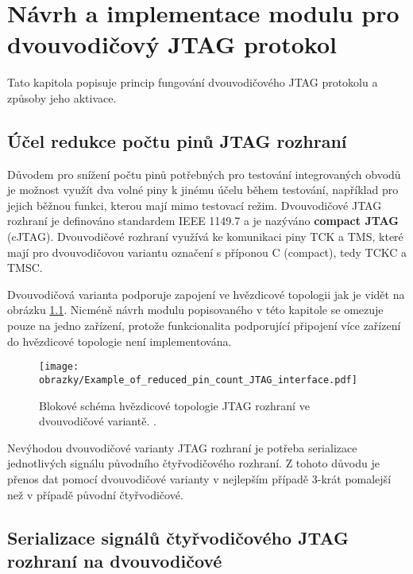 
\chapter{Návrh a implementace modulu pro dvouvodičový JTAG protokol}
Tato kapitola popisuje princip fungování dvouvodičového \acs{JTAG} protokolu a způsoby jeho aktivace.

\section{Účel redukce počtu pinů \acs{JTAG} rozhraní}	\label{sec:2w_interface}
Důvodem pro snížení počtu pinů potřebných pro testování integrovaných obvodů je možnost využít dva volné piny k jinému účelu během testování, například pro jejich běžnou funkci, kterou mají mimo testovací režim. Dvouvodičové \acs{JTAG} rozhraní je definováno standardem IEEE 1149.7 a je nazýváno \textbf{compact \acs{JTAG}} (c\acs{JTAG}). Dvouvodičové rozhraní využívá ke komunikaci piny \acs{TCK} a \acs{TMS}, které mají pro dvouvodičovou variantu označení s příponou C (compact), tedy TCKC a TMSC. \cite{IEEE_1149-7} \cite{JTAG}

Dvouvodičová varianta podporuje zapojení ve hvězdicové topologii jak je vidět na obrázku \ref{fig:star2_sch}. Nicméně návrh modulu popisovaného v této kapitole se omezuje pouze na jedno zařízení, protože funkcionalita podporující připojení více zařízení do hvězdicové topologie není implementována.

\begin{figure}[!h]
  \begin{center}
    \texttt{[image: obrazky/Example\_of\_reduced\_pin\_count\_JTAG\_interface.pdf]}
  \end{center}
  \caption{Blokové schéma hvězdicové topologie \acs{JTAG} rozhraní ve dvouvodičové variantě. \cite{JTAG}.}
	\label{fig:star2_sch}
\end{figure}

Nevýhodou dvouvodičové varianty \acs{JTAG} rozhraní je potřeba serializace jednotlivých signálu původního čtyřvodičového rozhraní. Z tohoto důvodu je přenos dat pomocí dvouvodičové varianty v nejlepším případě 3-krát pomalejší než v případě původní čtyřvodičové. \cite{IEEE_1149-7}
\section{Serializace signálů čtyřvodičového \acs{JTAG} rozhraní na dvouvodičové}	\label{sec:oscan1} 


